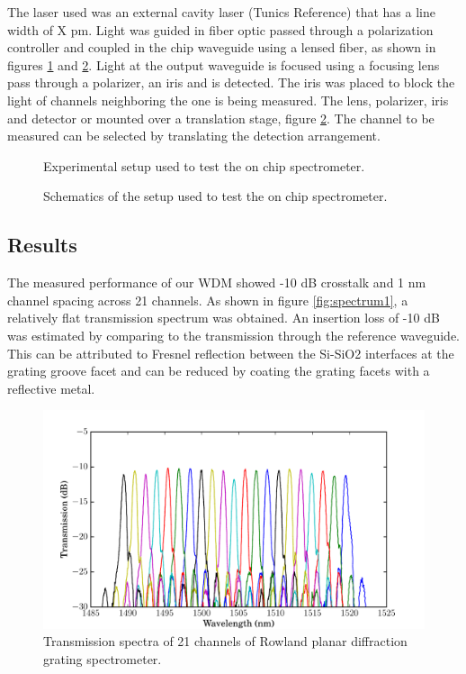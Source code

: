 \documentclass[12pt,twoside,english]{book}
\renewcommand{\~}{\perispomeni}%
\numberwithin{equation}{section}
\numberwithin{figure}{section}
\begin{document}
The laser used was an external cavity laser (Tunics Reference) that has a line width of X pm. Light was guided in  fiber optic passed through a polarization controller and coupled in the chip waveguide using a lensed fiber, as shown in figures \ref{fig:setup photograph} and \ref{fig:setup schematics}. Light at the output waveguide is focused using a focusing lens pass through a polarizer, an iris and is detected. The iris was placed to block the light of channels neighboring the one is being measured. The lens, polarizer, iris and detector or mounted over a translation stage, figure \ref{fig:setup schematics}. The channel to be measured can be selected by translating the detection arrangement.
%
\begin{figure}[h]
\center{}\caption{Experimental setup used to test the on chip spectrometer.}
\label{fig:setup photograph}
\end{figure}
%
\begin{figure}[h]
\center{}\caption{Schematics of the setup used to test the on chip spectrometer.}
\label{fig:setup schematics}
\end{figure}

\subsection{Results}
The measured performance of our \gls{WDM} showed -10 dB crosstalk and 1 nm channel spacing across 21 channels. As shown in figure \ref{fig:spectrum1}, a relatively flat transmission spectrum was obtained. An insertion loss of -10 dB was estimated by comparing to the transmission through the reference waveguide. This can be attributed to Fresnel reflection between the Si-SiO2 interfaces at the grating groove facet and can be reduced by coating the grating facets with a reflective metal.
\begin{figure}[h]
\includegraphics{graphs/gen5}
\caption{Transmission spectra of 21 channels of Rowland planar diffraction grating spectrometer.}
\label{fig:spectrum 1}
\end{figure}
\end{document}
